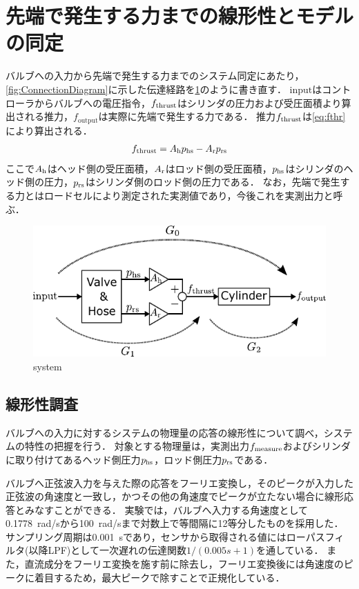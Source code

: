 \section{先端で発生する力までの線形性とモデルの同定}
\label{sec:力までの同定}
バルブへの入力から先端で発生する力までのシステム同定にあたり，\figname\ref{fig:ConnectionDiagram}に示した伝達経路を\figname\ref{fig:system_dentatsu}のように書き直す．
$\mathrm{input}$はコントローラからバルブへの電圧指令，$f_\mathrm{thrust}$はシリンダの圧力および受圧面積より算出される推力，$f_\mathrm{output}$は実際に先端で発生する力である．
推力$f_\mathrm{thrust}$は\eqnname\ref{eq:fthr}により算出される．
\begin{align}
    \label{eq:fthr}
    f_\mathrm{thrust} = A_\mathrm{h}  p_\mathrm{hs} - A_\mathrm{r} p_\mathrm{rs}
\end{align}
ここで$A_\mathrm{h}$はヘッド側の受圧面積，$A_\mathrm{r}$はロッド側の受圧面積，$p_\mathrm{hs}$はシリンダのヘッド側の圧力，$p_\mathrm{rs}$はシリンダ側のロッド側の圧力である．
なお，先端で発生する力とはロードセルにより測定された実測値であり，今後これを実測出力と呼ぶ．
\begin{figure}[t]
    \centering
        \includegraphics[keepaspectratio, scale=1.0]{contents/SystemIdentification/figure/system_dentatsu.pdf}
        \caption{system}
        \label{fig:system_dentatsu}
\end{figure}

\subsection{線形性調査}
\label{sec:線形性調査(力)}
バルブへの入力に対するシステムの物理量の応答の線形性について調べ，システムの特性の把握を行う．
対象とする物理量は，実測出力$f_\mathrm{measure}$およびシリンダに取り付けてあるヘッド側圧力$p_\mathrm{hs}$，ロッド側圧力$p_\mathrm{rs}$である．

バルブへ正弦波入力を与えた際の応答をフーリエ変換し，そのピークが入力した正弦波の角速度と一致し，かつその他の角速度でピークが立たない場合に線形応答とみなすことができる．
実験では，バルブへ入力する角速度として\SI{0.1778}{rad/s}から\SI{100}{rad/s}まで対数上で等間隔に12等分したものを採用した．
サンプリング周期は\SI{0.001}{s}であり，センサから取得される値にはローパスフィルタ(以降LPF)として一次遅れの伝達関数${1}/(0.005s+1)$を通している．
また，直流成分をフーリエ変換を施す前に除去し，フーリエ変換後には角速度のピークに着目するため，最大ピークで除すことで正規化している．

